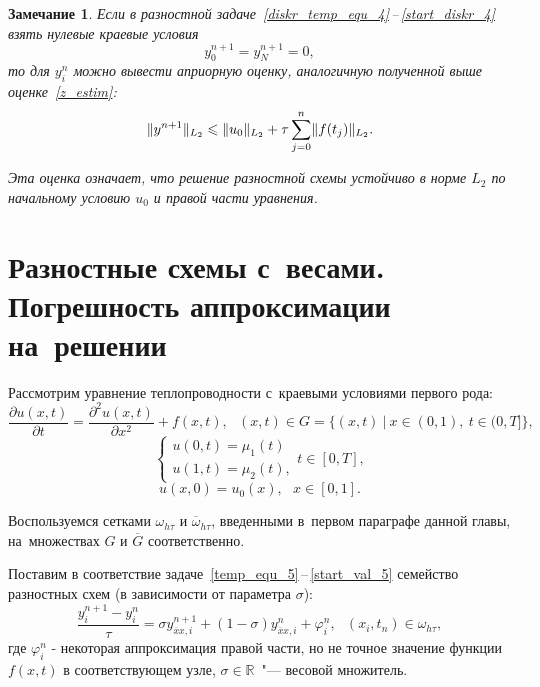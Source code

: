 \documentclass[11pt,a4paper,twoside,listtotoc,bibtotoc]{report}
\numberwithin{equation}{section}
\theoremstyle{definition}
\theoremstyle{plain}
\newtheorem*{note*}{Замечание}
\DeclarePairedDelimiter\norm{\lVert}{\rVert}
\begin{document}
%
\begin{note*}
%
    Если в разностной задаче~\eqref{diskr_temp_equ_4}\,--\,\eqref{start_diskr_4}
    взять нулевые краевые условия
    $$
        y_0^{n+1} = y_N^{n+1} = 0,
    $$
    то для $y_i^n$ можно вывести априорную оценку, аналогичную полученной
    выше оценке~\eqref{z_estim}:
    $$
        \norm{y^{n+1}}_{L_2} \leqslant \norm{u_0}_{L_2} +
        \tau\sum_{j=0}^n \norm{f(t_j)}_{L_2}.
    $$

    Эта оценка означает, что решение разностной схемы устойчиво в норме $L_2$
    по начальному условию $u_0$ и правой части уравнения.
%
\end{note*}
%

%
\section{Разностные схемы с~весами. Погрешность аппроксимации на~решении}
%
Рассмотрим уравнение теплопроводности с~краевыми условиями первого рода:
%
\begin{equation}
%
    \label{temp_equ_5}
    \frac{\partial u(x,t)}{\partial t} =
    \frac{\partial^2u(x,t)}{\partial x^2} + f(x,t),
    ~~~(x,t) \in G = \{(x, t)~|~x \in (0,1),~t\in (0,T]\},
%
\end{equation}
%
%
\begin{equation}
%
    \label{bord_5}
    \begin{cases}
        u(0,t) = \mu_1(t) \\
        u(1,t) = \mu_2(t),
    \end{cases}
    t\in [0,T],
%
\end{equation}
%
%
\begin{equation}
%
    \label{start_val_5}
    u(x,0) = u_0(x),~~~x\in[0,1].
%
\end{equation}

Воспользуемся сетками $\omega_{h \tau}$ и $\overline{\omega}_{h \tau}$,
введенными в~первом параграфе данной главы, на~множествах $G$ и
$\overline{G}$ соответственно.

Поставим в соответствие задаче~\eqref{temp_equ_5}\,--\,\eqref{start_val_5} семейство
разностных схем (в зависимости от параметра $\sigma$):
%
\begin{equation}
%
    \label{diskr_family}
    \dfrac{y_i^{n+1} - y_i^n}{\tau} = \sigma y_{\overline{x}x,i}^{n+1} +
    \left(1 - \sigma\right) y_{\overline{x}x,i}^n + \varphi_i^n, ~~~(x_i,t_n)\in\omega_{h \tau},
%
\end{equation}
%
где $\varphi_i^n$ - некоторая аппроксимация правой части, но не точное значение
функции $f(x,t)$ в соответствующем узле, $\sigma\in\mathbb{R}$~"--- весовой множитель.
\end{document}
